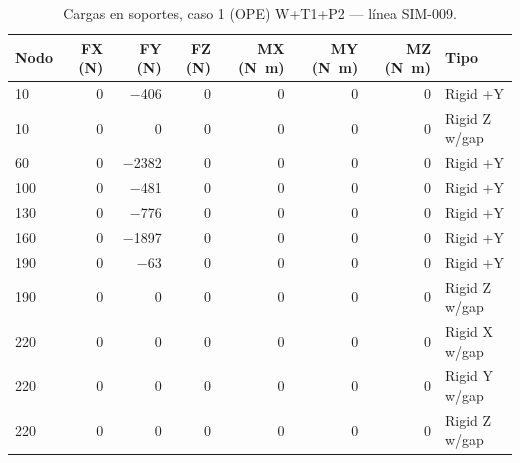 \begin{table}[htbp]
  \centering
  \footnotesize
  \caption{Cargas en soportes, caso 1 (OPE) W+T1+P2 — línea SIM-009.}
  \label{tab:restricciones-ope}
  \begin{tabular}{lrrrrrrl}
    \toprule
    Nodo & FX (\si{N}) & FY (\si{N}) & FZ (\si{N}) & MX (\si{N.m}) & MY (\si{N.m}) & MZ (\si{N.m}) & Tipo \\
    \midrule
    10 & \num{0} & \num{-406} & \num{0} & \num{0} & \num{0} & \num{0} & Rigid +Y \\
    10 & \num{0} & \num{0} & \num{0} & \num{0} & \num{0} & \num{0} & Rigid Z w/gap \\
    60 & \num{0} & \num{-2382} & \num{0} & \num{0} & \num{0} & \num{0} & Rigid +Y \\
    100 & \num{0} & \num{-481} & \num{0} & \num{0} & \num{0} & \num{0} & Rigid +Y \\
    130 & \num{0} & \num{-776} & \num{0} & \num{0} & \num{0} & \num{0} & Rigid +Y \\
    160 & \num{0} & \num{-1897} & \num{0} & \num{0} & \num{0} & \num{0} & Rigid +Y \\
    190 & \num{0} & \num{-63} & \num{0} & \num{0} & \num{0} & \num{0} & Rigid +Y \\
    190 & \num{0} & \num{0} & \num{0} & \num{0} & \num{0} & \num{0} & Rigid Z w/gap \\
    220 & \num{0} & \num{0} & \num{0} & \num{0} & \num{0} & \num{0} & Rigid X w/gap \\
    220 & \num{0} & \num{0} & \num{0} & \num{0} & \num{0} & \num{0} & Rigid Y w/gap \\
    220 & \num{0} & \num{0} & \num{0} & \num{0} & \num{0} & \num{0} & Rigid Z w/gap \\
    \bottomrule
  \end{tabular}
\end{table}
